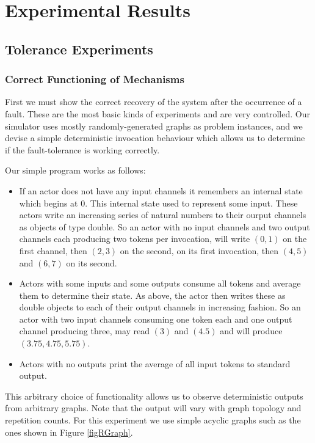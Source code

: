 \chapter{Experimental Results}
\label{chapExperiment}

\section{Tolerance Experiments}

\subsection{Correct Functioning of Mechanisms}

First we must show the correct recovery of the system after the occurrence of a fault.
These are the most basic kinds of experiments and are very controlled.
Our simulator uses mostly randomly-generated graphs as problem instances, and we devise a simple deterministic invocation behaviour which allows us to determine if the fault-tolerance is working correctly.

Our simple program works as follows:
\begin{itemize}
	\item If an actor does not have any input channels it remembers an internal state which begins at 0.
			This internal state used to represent some input.
			These actors write an increasing series of natural numbers to their ourput channels as objects of type double.
			So an actor with no input channels and two output channels each producing two tokens per invocation, will write $(0,1)$ on the first channel, then $(2,3)$ on the second, on its first invocation, then $(4, 5)$ and $(6, 7)$ on its second.
	\item Actors with some inputs and some outputs consume all tokens and average them to determine their state.
			As above, the actor then writes these as double objects to each of their output channels in increasing fashion.
			So an actor with two input channels consuming one token each and one output channel producing three, may read $(3)$ and $(4.5)$ and will produce $(3.75, 4.75, 5.75)$.
	\item Actors with no outputs print the average of all input tokens to standard output.
\end{itemize}
\noindent This arbitrary choice of functionality allows us to observe deterministic outputs from arbitrary graphs.
Note that the output will vary with graph topology and repetition counts.
For this experiment we use simple acyclic graphs such as the ones shown in Figure \ref{figRGraph}.

